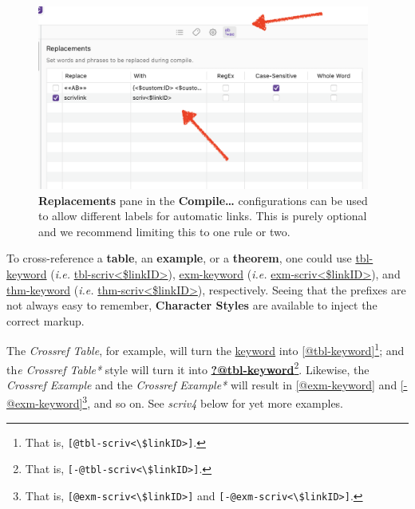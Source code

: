 \documentclass[
  12pt,
  a4paper,
  oneside,
  numbers=noenddot,
  titlepage,
  toclink=all,
  toc=bibliography]{scrbook}
\theoremstyle{definition}
\theoremstyle{definition}
\theoremstyle{definition}
\theoremstyle{plain}
\theoremstyle{plain}
\theoremstyle{plain}
\theoremstyle{plain}
\theoremstyle{plain}
\theoremstyle{remark}
\begin{document}
\begin{figure}

{\centering \includegraphics[width=4.30208in,height=2.38542in]{Replacements.png}

}

\caption{\label{fig-scriv3}\textbf{Replacements} pane in the
\textbf{Compile\ldots{}} configurations can be used to allow different
labels for automatic links. This is purely optional and we recommend
limiting this to one rule or two.}

\end{figure}

{}To cross-reference a \textbf{table}, an
\textbf{example}, or a \textbf{theorem}, one could use \ul{tbl-keyword}
(\emph{i.e.} \ul{tbl-scriv\textless\$linkID\textgreater{}}),
\ul{exm-keyword} (\emph{i.e.}
\ul{exm-scriv\textless\$linkID\textgreater{}}), and \ul{thm-keyword}
(\emph{i.e.} \ul{thm-scriv\textless\$linkID\textgreater{}}),
respectively. Seeing that the prefixes are not always easy to remember,
\textbf{Character Styles} are available to inject the correct markup.

The \emph{Crossref Table}, for example, will turn the \ul{keyword} into
\ul{{[}@tbl-keyword{]}}\footnote{That is,
  \texttt{{[}@tbl-scriv\textless{}\textbackslash{}\$linkID\textgreater{}{]}}.}\ul{;}
and th\emph{e Crossref Table*} style will turn it into
\ul{\protect\hypertarget{cite_7}{}{\label{cite_7}\textbf{?@tbl-keyword}}}\footnote{That
  is,
  \texttt{{[}-@tbl-scriv\textless{}\textbackslash{}\$linkID\textgreater{}{]}}.}.
{} Likewise, the \emph{Crossref
Example} and the \emph{Crossref Example*} will result in
\ul{{[}@exm-keyword{]}} and \ul{{[}-@exm-keyword{]}}\footnote{That is,
  \texttt{{[}@exm-scriv\textless{}\textbackslash{}\$linkID\textgreater{}{]}}
  and
  \texttt{{[}-@exm-scriv\textless{}\textbackslash{}\$linkID\textgreater{}{]}}.},
and so on. See \emph{scriv4} below for yet more examples.
\end{document}
